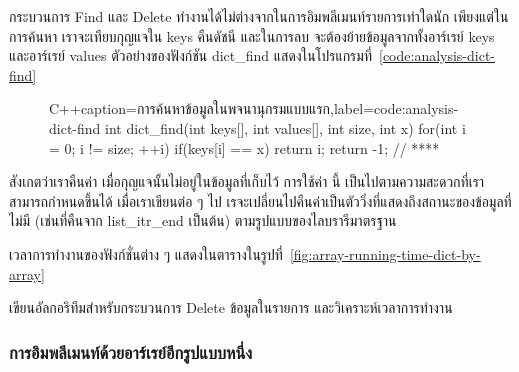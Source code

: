 กระบวนการ Find และ Delete ทำงาน{\wbr}ได้{\wbr}ไม่{\wbr}ต่าง{\wbr}จาก{\wbr}ใน{\wbr}การ{\wbr}อิม{\wbr}พลี{\wbr}เมนท์{\wbr}รายการ{\wbr}เท่าใด{\wbr}นัก{\wbr}
เพียงแต่{\wbr}ใน{\wbr}การ{\wbr}ค้นหา เรา{\wbr}จะ{\wbr}เทียบ{\wbr}กุญแจ{\wbr}ใน {\ct keys} คืน{\wbr}ดัชนี และ{\wbr}ใน{\wbr}การ{\wbr}ลบ{\wbr}
จะ{\wbr}ต้อง{\wbr}ย้าย{\wbr}ข้อมูล{\wbr}จาก{\wbr}ทั้ง{\wbr}อาร์เรย์ {\ct keys} และ{\wbr}อาร์เรย์ {\ct values}
ตัวอย่าง{\wbr}ของ{\wbr}ฟังก์ชัน {\ct dict\_find }
แสดง{\wbr}ใน{\wbr}โปรแกรม{\wbr}ที่~\ref{code:analysis-dict-find}

\begin{figure}
\latintext
\begin{codelist}{C++}{caption={\thaitext การ{\wbr}ค้นหา{\wbr}ข้อมูล{\wbr}ใน{\wbr}พจนานุกรม{\wbr}แบบ{\wbr}แรก\latintext},label=code:analysis-dict-find}
int dict_find(int keys[], int values[], int size, int x)
{
  for(int i = 0; i != size; ++i)
    if(keys[i] == x)
      return i;
  return -1;                // ****
}
\end{codelist}
\thaitext
\end{figure}

สังเกต{\wbr}ว่า{\wbr}เรา{\wbr}คืน{\wbr}ค่า {} เมื่อ{\wbr}กุญแจ{\wbr}นั้น{\wbr}ไม่{\wbr}อยู่{\wbr}ใน{\wbr}ข้อมูล{\wbr}ที่{\wbr}เก็บ{\wbr}ไว้ การ{\wbr}ใช้{\wbr}ค่า {} นี้{\wbr}
เป็น{\wbr}ไป{\wbr}ตาม{\wbr}ความ{\wbr}สะดวก{\wbr}ที่{\wbr}เรา{\wbr}สามารถ{\wbr}กำหนด{\wbr}ขึ้น{\wbr}ได้ เมื่อ{\wbr}เรา{\wbr}เขียน{\wbr}ต่อ ๆ ไป{\wbr}
เรจะ{\wbr}เปลี่ยน{\wbr}ไป{\wbr}คืน{\wbr}ค่า{\wbr}เป็น{\wbr}ตัว{\wbr}วิ่ง{\wbr}ที่{\wbr}แสดง{\wbr}ถึง{\wbr}สถานะ{\wbr}ของ{\wbr}ข้อมูล{\wbr}ที่{\wbr}ไม่{\wbr}มี (เช่น{\wbr}ที่{\wbr}คืน{\wbr}จาก {\ct
  list\_itr\_end} เป็นต้น) ตาม{\wbr}รูปแบบ{\wbr}ของ{\wbr}ไลบ{\wbr}รา{\wbr}รี{\wbr}มาตรฐาน{\wbr}

เวลา{\wbr}การ{\wbr}ทำงาน{\wbr}ของ{\wbr}ฟังก์ชั่น{\wbr}ต่าง ๆ
แสดง{\wbr}ใน{\wbr}ตาราง{\wbr}ใน{\wbr}รูป{\wbr}ที่~\ref{fig:array-running-time-dict-by-array}

\begin{quiz}{}
เขียน{\wbr}อัล{\wbr}กอ{\wbr}ริ{\wbr}ทึม{\wbr}สำหรับ{\wbr}กระบวนการ Delete ข้อมูล{\wbr}ใน{\wbr}รายการ และ{\wbr}วิเคราะห์{\wbr}เวลา{\wbr}การ{\wbr}ทำงาน{\wbr}
\end{quiz}

\subsubsection{การ{\wbr}อิม{\wbr}พลี{\wbr}เมนท์{\wbr}ด้วย{\wbr}อาร์เรย์{\wbr}อีก{\wbr}รูปแบบ{\wbr}หนึ่ง}
\label{sect:analysis-binary-search}

